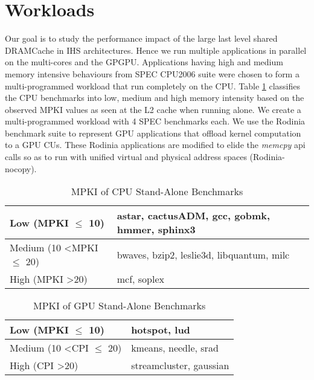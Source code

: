 \section{Workloads} 
Our goal is to study the performance impact of the large last level shared DRAMCache in IHS architectures. Hence we run multiple applications in parallel on the multi-cores and the GPGPU. Applications having high and medium memory intensive behaviours from SPEC CPU2006 suite \cite{spec2006} were chosen to form a multi-programmed workload that run completely on the CPU. Table \ref{single-cpu-mpki} classifies the CPU benchmarks into low, medium and high memory intensity based on the observed MPKI values as seen at the L2 cache when running alone. We create a multi-programmed workload with 4 SPEC benchmarks each. We use the Rodinia benchmark suite \cite{rodinia} to represent GPU applications that offload kernel computation to a GPU CUs. These Rodinia applications are modified to elide the \textit{memcpy} api calls so as to run with unified virtual and physical address spaces (Rodinia-nocopy). 

\begin{table}[htb]
	\centering
	\begin{tabular}{|l|l|}
		\hline
		Low (MPKI $\leq$ 10)          \hspace{5em}      & astar, cactusADM, gcc, gobmk, hmmer, sphinx3    \\ \hline
		Medium (10 \textless MPKI $\leq$ 20) & bwaves, bzip2, leslie3d, libquantum, milc \\ \hline
		High (MPKI \textgreater 20)            & mcf, soplex       \\ \hline
	\end{tabular}
	\caption{MPKI of CPU Stand-Alone Benchmarks}
	\label{single-cpu-mpki}
\end{table}

\begin{table}[htb]
	\centering
	\begin{tabular}{|l|l|}
		\hline
		Low (MPKI $\leq$ 10)                & hotspot, lud           \\ \hline
		Medium (10 \textless CPI $\leq$ 20) &  kmeans, needle, srad   \\ \hline
		High (CPI \textgreater 20)            & streamcluster, gaussian       \\ \hline
	\end{tabular}
	\caption{MPKI of GPU Stand-Alone Benchmarks}
	\label{single-gpu-mpki}
\end{table}

